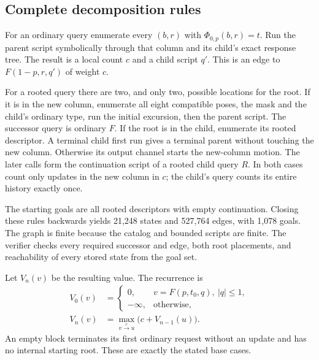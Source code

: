 \documentclass[11pt]{article}
\theoremstyle{definition}\newtheorem{definition}[theorem]{Definition}
\newcommand{\minusinf}{-\infty}
\begin{document}
\subsection{Complete decomposition rules}
For an ordinary query enumerate every $(b,r)$ with $\Phi_{0,p}(b,r)=t$.
Run the parent script symbolically through that column and its child's exact
response tree. The result is a local count $c$ and a child script $q'$.
This is an edge to $F(1-p,r,q')$ of weight $c$.

For a rooted query there are two, and only two, possible locations for the root.
If it is in the new column, enumerate all eight compatible poses, the mask and
the child's ordinary type, run the initial excursion, then the parent script.
The successor query is ordinary $F$. If the root is in the child, enumerate
its rooted descriptor. A terminal child first run gives a terminal parent
without touching the new column. Otherwise its output channel starts the
new-column motion. The later calls form the continuation script of a rooted
child query $R$. In both cases count only updates in the new column in $c$;
the child's query counts its entire history exactly once.

The starting goals are all rooted descriptors with empty continuation. Closing
these rules backwards yields 21,248 states and 527,764 edges, with 1,078 goals.
The graph is finite because the catalog and bounded scripts are finite.
The verifier checks every required successor and edge, both root placements,
and reachability of every stored state from the goal set.

Let $V_n(v)$ be the resulting value. The recurrence is
\begin{align}
 V_0(v)&=\begin{cases}
 0,&v=F(p,t_0,q),\ |q|\le1,\\
 \minusinf,&\text{otherwise},
 \end{cases}\nonumber\\
 V_n(v)&=\max_{v\xrightarrow{c}u}\bigl(c+V_{n-1}(u)\bigr).\label{eq:dp}
\end{align}
An empty block terminates its first ordinary request without an update and
has no internal starting root. These are exactly the stated base cases.
\end{document}
